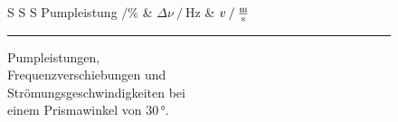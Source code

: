 \begin{figure} 
    \begin{minipage}[t]{.5\textwidth}
    \centering
    \begin{table}[H]
        \centering
        \captionsetup{justification=centering}
        \caption{Pumpleistungen, \\Frequenzverschiebungen und \\ Strömungsgeschwindigkeiten bei \\ einem Prismawinkel von $30 \,°$.}
        \label{tab:1winkel2} 
       \begin{tabular}{S S S}
        \toprule 
        {Pumpleistung $\mathbin{/}\%$} & {$\Delta \nu \mathbin{/} \unit{\hertz}$} & {$v \mathbin{/} \unit{\frac{\meter}{\second}}$}  \\
        \midrule 
        \bottomrule
       \end{tabular} 
    \end{table}
    \end{minipage}
    \begin{minipage}[t]{.5\textwidth} 
        \centering
        \vspace*{0pt}\rule{.95\textwidth}{12em} %
        \captionsetup{justification=centering}
    \end{minipage} 
\end{figure} 

